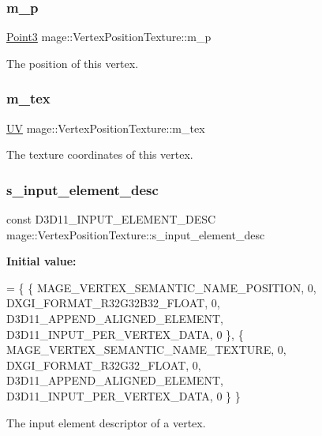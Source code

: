 \subsubsection{\texorpdfstring{m\+\_\+p}{m\_p}}
{\footnotesize\ttfamily \hyperlink{structmage_1_1_point3}{Point3} mage\+::\+Vertex\+Position\+Texture\+::m\+\_\+p}

The position of this vertex. \hypertarget{structmage_1_1_vertex_position_texture_af742cea48363bd9a1574d36a2cf5b2c6}{}\label{structmage_1_1_vertex_position_texture_af742cea48363bd9a1574d36a2cf5b2c6} 
\subsubsection{\texorpdfstring{m\+\_\+tex}{m\_tex}}
{\footnotesize\ttfamily \hyperlink{structmage_1_1_u_v}{UV} mage\+::\+Vertex\+Position\+Texture\+::m\+\_\+tex}

The texture coordinates of this vertex. \hypertarget{structmage_1_1_vertex_position_texture_a80b0fac785de688b33c155ea212c2cf3}{}\label{structmage_1_1_vertex_position_texture_a80b0fac785de688b33c155ea212c2cf3} 
\subsubsection{\texorpdfstring{s\+\_\+input\+\_\+element\+\_\+desc}{s\_input\_element\_desc}}
{\footnotesize\ttfamily const D3\+D11\+\_\+\+I\+N\+P\+U\+T\+\_\+\+E\+L\+E\+M\+E\+N\+T\+\_\+\+D\+E\+SC mage\+::\+Vertex\+Position\+Texture\+::s\+\_\+input\+\_\+element\+\_\+desc\hspace{0.3cm}{\ttfamily [static]}}

{\bfseries Initial value\+:}
\begin{DoxyCode}
= \{
        \{ MAGE\_VERTEX\_SEMANTIC\_NAME\_POSITION, 0, DXGI\_FORMAT\_R32G32B32\_FLOAT,    0, 
      D3D11\_APPEND\_ALIGNED\_ELEMENT, D3D11\_INPUT\_PER\_VERTEX\_DATA, 0 \},
        \{ MAGE\_VERTEX\_SEMANTIC\_NAME\_TEXTURE,  0, DXGI\_FORMAT\_R32G32\_FLOAT,       0, 
      D3D11\_APPEND\_ALIGNED\_ELEMENT, D3D11\_INPUT\_PER\_VERTEX\_DATA, 0 \}
    \}
\end{DoxyCode}
The input element descriptor of a vertex. \hypertarget{structmage_1_1_vertex_position_texture_a185dc518d4f2f23d69916978f71355e2}{}\label{structmage_1_1_vertex_position_texture_a185dc518d4f2f23d69916978f71355e2} 
